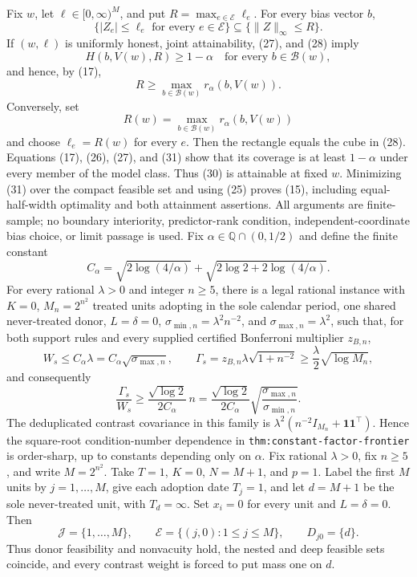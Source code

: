 Fix \(w\), let \(\ell\in[0,\infty)^M\), and put
\(R=\max_{e\in\mathcal E}\ell_e\).  For every bias vector \(b\),
\[
 \{|Z_e|\leq\ell_e\text{ for every }e\in\mathcal E\}
 \subseteq\{\lVert Z\rVert_\infty\leq R\}. \tag{28}
\]
If \((w,\ell)\) is uniformly honest, joint attainability, (27), and (28)
imply
\[
 H(b,V(w),R)\geq1-\alpha
 \quad\text{for every }b\in\mathcal B(w), \tag{29}
\]
and hence, by (17),
\[
 R\geq\max_{b\in\mathcal B(w)}r_\alpha(b,V(w)). \tag{30}
\]
Conversely, set
\[
 R(w)=\max_{b\in\mathcal B(w)}r_\alpha(b,V(w)) \tag{31}
\]
and choose \(\ell_e=R(w)\) for every \(e\).  Then the rectangle equals the
cube in (28).  Equations (17), (26), (27), and (31) show that its coverage is
at least \(1-\alpha\) under every member of the model class.  Thus (30) is
attainable at fixed \(w\).  Minimizing (31) over the compact feasible set and
using (25) proves (15), including equal-half-width optimality and both
attainment assertions.  All arguments are finite-sample; no boundary
interiority, predictor-rank condition, independent-coordinate bias choice, or
limit passage is used.
Fix \(\alpha\in\mathbb Q\cap(0,1/2)\) and define the finite constant
\[
 C_\alpha=\sqrt{2\log(4/\alpha)}+
 \sqrt{2\log 2+2\log(4/\alpha)}.
\]
For every rational \(\lambda>0\) and integer \(n\geq5\), there is a legal
rational instance with
\(K=0\), \(M_n=2^{n^2}\) treated units adopting in the sole calendar period,
one shared never-treated donor, \(L=\delta=0\),
\(\sigma_{\min,n}=\lambda^2n^{-2}\), and
\(\sigma_{\max,n}=\lambda^2\), such that, for both
support rules and every supplied certified Bonferroni multiplier \(z_{B,n}\),
\[
 W_s\leq C_\alpha\lambda=C_\alpha\sqrt{\sigma_{\max,n}},
 \qquad
 \Gamma_s=z_{B,n}\lambda\sqrt{1+n^{-2}}
 \geq\frac{\lambda}{2}\sqrt{\log M_n}, \tag{32}
\]
and consequently
\[
 \frac{\Gamma_s}{W_s}
 \geq\frac{\sqrt{\log2}}{2C_\alpha}\,n
 =\frac{\sqrt{\log2}}{2C_\alpha}
 \sqrt{\frac{\sigma_{\max,n}}{\sigma_{\min,n}}}. \tag{33}
\]
The deduplicated contrast covariance in this family is
\(\lambda^2(n^{-2}I_{M_n}+\mathbf1\mathbf1^{\top})\).  Hence the square-root
condition-number dependence in \texttt{thm:constant-factor-frontier} is
order-sharp, up to constants depending only on \(\alpha\).
Fix rational \(\lambda>0\), fix \(n\geq5\), and write \(M=2^{n^2}\).
Take \(T=1\), \(K=0\),
\(N=M+1\), and \(p=1\).  Label the first \(M\) units by
\(j=1,\ldots,M\), give each adoption date \(T_j=1\), and let
\(d=M+1\) be the sole never-treated unit, with \(T_d=\infty\).  Set
\(x_i=0\) for every unit and \(L=\delta=0\).  Then
\[
 \mathcal J=\{1,\ldots,M\},\qquad
 \mathcal E=\{(j,0):1\leq j\leq M\},\qquad
 D_{j0}=\{d\}. \tag{34}
\]
Thus donor feasibility and nonvacuity hold, the nested and deep feasible sets
coincide, and every contrast weight is forced to put mass one on \(d\).

